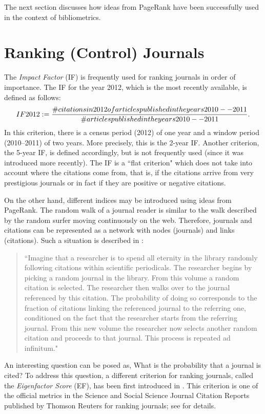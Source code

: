 \documentclass[11pt,draftcls,onecolumn]{IEEEtran}
\begin{document}
The next section discusses how ideas from PageRank have been
successfully used in the context of bibliometrics.

\section*{Ranking (Control) Journals}

The {\it Impact Factor} (IF) is frequently used
for ranking journals in order of importance.
The IF for the year 2012, which is the most recently available, is defined as follows:
$$
\mbox{IF 2012} 
   := \frac{\mbox{\# citations in 2012 of articles published in the years 2010--2011}}{%
                 \mbox{\# articles published in the years 2010--2011}}.
$$
In this criterion, there is a census period (2012) of one year and a window 
period (2010--2011) of two years.  
More precisely, this is the 2-year IF. Another criterion, the 5-year IF, 
is defined accordingly, but is not frequently used (since it was introduced more
recently).
The IF is a ``flat criterion" which does not take into account 
where the citations come from, that is, if the citations arrive 
from very prestigious journals or in fact if they are positive or negative citations.


On the other hand, different indices may be introduced using ideas from PageRank. 
The random walk of a journal reader is similar to the walk described by the 
random surfer moving continuously on the web. Therefore, 
journals and citations can be represented as a network with 
nodes (journals) and links (citations). 
Such a situation is described in \cite{WesBerBer:10}: 
\begin{quote}
``Imagine that a researcher is to spend all eternity in the library randomly 
following citations within scientific periodicals. The researcher begins by 
picking a random journal in the library. From this volume a random citation 
is selected. The researcher then walks over to the journal referenced by this 
citation. The probability of doing so corresponds to the fraction of
citations linking the referenced journal to the referring one, 
conditioned on the fact that the researcher starts from the referring
journal. From this new volume the researcher now selects another 
random citation and proceeds to that journal. 
This process is repeated ad infinitum." 
\end{quote}
An interesting question can be posed as,
What is the probability that a journal is cited? To address this question, a different criterion for ranking journals, 
called the {\it Eigenfactor Score} %
(EF), has been first introduced in \cite{Ber:07}. This criterion is one of the official metrics 
in the Science and Social Science Journal Citation Reports
published
by Thomson Reuters for ranking journals; see \cite{Franceschet:13} for details.
\end{document}
